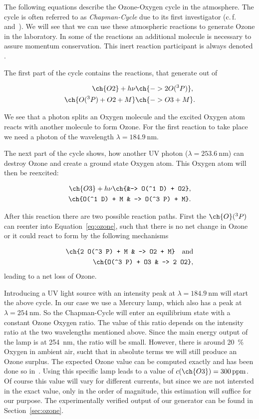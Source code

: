 The following equations describe the Ozone-Oxygen cycle in the
atmosphere.  The cycle is often referred to as \emph{Chapman-Cycle}
due to its first investigator (c.\,f.~\cite{chapman}
and~\cite{roedel}). We will see that we can use these atmospheric
reactions to generate Ozone in the laboratory. In some of the
reactions an additional molecule is necessary to assure momentum
conservation. This inert reaction participant is always denoted
.

The first part of the cycle contains the reactions, that generate
 out of 

\begin{align}
  \ch{O2} + h\nu &\ch{-> 2 O(^3P)},\nonumber\\
  \ch{O(^3 P) + O2 + M} &\ch{-> O3 + M}. \label{eq:ozone}
\end{align}

We see that a photon splits an Oxygen molecule and the excited
Oxygen atom reacts with another  molecule to form Ozone. For
the first reaction to take place we need a photon of the wavelength
$\lambda = \SI{184.9}{\nano\meter}$.

The next part of the cycle shows, how another UV photon ($\lambda =
\SI{253.6}{\nano\meter}$) can destroy
Ozone and create a ground state Oxygen atom. This Oxygen atom will
then be reexcited:

\begin{align}
  \ch{O3} + h\nu \ch{&-> O(^1 D) +
  O2}, \label{eq:split}\\
  \ch{O(^1 D) + M & -> O(^3 P) + M}.\nonumber
\end{align}

After this reaction there are two possible reaction paths. First the $\ch{O}(^3
P)$ can reenter into Equation~\eqref{eq:ozone}, such that there is no
net change in Ozone or it could react to form  by the
following mechanisms

\begin{align*}
  \ch{2 O(^3 P) + M & -> O2 + M} \quad \text{and}\\
  \ch{O(^3 P) + O3 & -> 2 O2},
\end{align*}
leading to a net loss of Ozone. 

Introducing a UV light source with
an intensity peak at $\lambda = \SI{184.9}{\nano\meter}$
will start the above cycle. In our case we use a Mercury lamp, which
also has a peak at $\lambda = \SI{254}{\nano\meter}$. So the
Chapman-Cycle will enter an equilibrium state with a constant Ozone
Oxygen ratio. The value of this ratio depends on the
intensity ratio at the two wavelengths mentioned above. Since the
main energy output of the lamp is at \SI{254}{\nano\meter}, the ratio
will be small. However, there is around \SI{20}{\%} Oxygen in ambient
air, sucht that in absolute terms we will still produce an Ozone
surplus. The expected Ozone value can be computed exactly and has been
done so in~\cite{bsc}. Using this specific lamp leads to a value of
$c(\ch{O3}) = \SI{300}{ppm}$. Of course this value will vary for
different currents, but since we are not intersted in the exact value,
only in the order of magnitude, this estimation will suffice for our
purpose. The experimentally verified output of our generator can be
found in Section~\ref{sec:ozone}.

